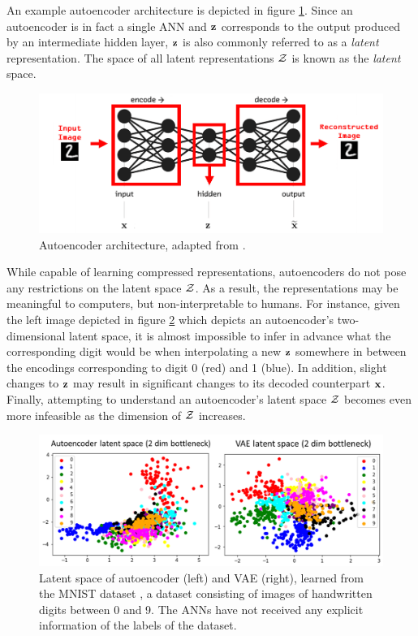 An example autoencoder architecture is depicted in figure \ref{fig:autoencoder}. Since an autoencoder is in fact a single ANN and $\mathbf{z}$ corresponds to the output produced by an intermediate hidden layer, $\mathbf{z}$ is also commonly referred to as a \textit{latent} representation. The space of all latent representations $\mathcal{Z}$ is known as the \textit{latent} space.
	\begin{figure}
		\centering
		\includegraphics[width=0.7\linewidth]{autoencoder}
		\caption{Autoencoder architecture, adapted from \citep{karagiannakosHowGenerateImages2018}.}
		\label{fig:autoencoder}
	\end{figure}
While capable of learning compressed representations, autoencoders do not pose any restrictions on the latent space $\mathcal{Z}$. As a result, the representations may be meaningful to computers, but non-interpretable to humans. For instance, given the left image depicted in figure \ref{fig:latent_space_2d} which depicts an autoencoder's two-dimensional latent space, it is almost impossible to infer in advance what the corresponding digit would be when interpolating a new $\mathbf{z}$ somewhere in between the encodings corresponding to digit 0 (red) and 1 (blue). In addition, slight changes to $\mathbf{z}$ may result in significant changes to its decoded counterpart $\mathbf{x}$. Finally, attempting to understand an autoencoder's latent space $\mathcal{Z}$ becomes even more infeasible as the dimension of $\mathcal{Z}$ increases.

\begin{figure}
	\centering
	\includegraphics[width=0.7\linewidth]{screenshot021}
	\caption{ Latent space of autoencoder (left) and VAE (right), learned from the MNIST dataset \citep{lecunGradientbasedLearningApplied1998}, a dataset consisting of images of handwritten digits between 0 and 9. The ANNs have not received any explicit information of the labels of the dataset. 
}
	\label{fig:latent_space_2d}
\end{figure}



